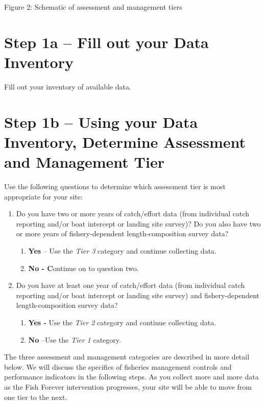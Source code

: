 \documentclass[]{book}
\begin{document}
Figure 2: Schematic of assessment and management tiers

\section{Step 1a -- Fill out your Data
Inventory}\label{step-1a-fill-out-your-data-inventory}

Fill out your inventory of available data.

\section{Step 1b -- Using your Data Inventory, Determine Assessment and
Management
Tier}\label{step-1b-using-your-data-inventory-determine-assessment-and-management-tier}

Use the following questions to determine which assessment tier is most
appropriate for your site:

\begin{enumerate}
\def\labelenumi{\arabic{enumi}.}
\item
  Do you have two or more years of catch/effort data (from individual
  catch reporting and/or boat intercept or landing site survey)? Do you
  also have two or more years of fishery-dependent length-composition
  survey data?

  \begin{enumerate}
  \def\labelenumii{\alph{enumii}.}
  \item
    \textbf{Yes} -- Use the \emph{Tier 3} category and continue
    collecting data.
  \item
    \textbf{No - C}ontinue on to question two.
  \end{enumerate}
\item
  Do you have at least one year of catch/effort data (from individual
  catch reporting and/or boat intercept or landing site survey) and
  fishery-dependent length-composition survey data?

  \begin{enumerate}
  \def\labelenumii{\alph{enumii}.}
  \item
    \textbf{Yes -} Use the \emph{Tier 2} category and continue
    collecting data.
  \item
    \textbf{No} --Use the \emph{Tier 1} category.
  \end{enumerate}
\end{enumerate}

The three assessment and management categories are described in more
detail below. We will discuss the specifics of fisheries management
controls and performance indicators in the following steps. As you
collect more and more data as the Fish Forever intervention progresses,
your site will be able to move from one tier to the next.
\end{document}
